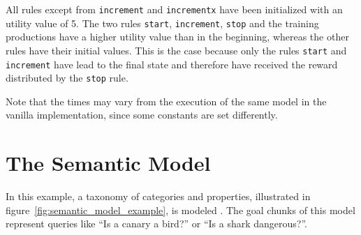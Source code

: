 All rules except from \lstinline|increment| and \lstinline|incrementx| have been initialized with an utility value of 5. The two rules \lstinline|start|, \lstinline|increment|, \lstinline|stop| and the training productions have a higher utility value than in the beginning, whereas the other rules have their initial values. This is the case because only the rules \lstinline|start| and \lstinline|increment| have lead to the final state and therefore have received the reward distributed by the \lstinline|stop| rule.

Note that the times may vary from the execution of the same model in the vanilla implementation, since some constants are set differently.


\section{The Semantic Model}

In this example, a taxonomy of categories and properties, illustrated in figure~\ref{fig:semantic_model_example}, is modeled \cite[unit 1, pp. 24\psqq]{actr_tutorial}. The goal chunks of this model represent queries like ``Is a canary a bird?'' or ``Is a shark dangerous?''.

